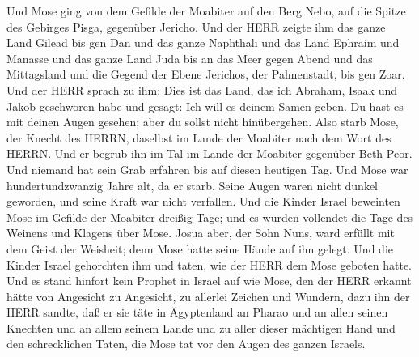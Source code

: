  Und Mose ging von dem Gefilde der Moabiter auf den Berg
Nebo, auf die Spitze des Gebirges Pisga, gegenüber Jericho. Und der HERR
zeigte ihm das ganze Land Gilead bis gen Dan  und das ganze
Naphthali und das Land Ephraim und Manasse und das ganze Land Juda bis
an das Meer gegen Abend  und das Mittagsland und die Gegend
der Ebene Jerichos, der Palmenstadt, bis gen Zoar.  Und der
HERR sprach zu ihm: Dies ist das Land, das ich Abraham, Isaak und Jakob
geschworen habe und gesagt: Ich will es deinem Samen geben. Du hast es
mit deinen Augen gesehen; aber du sollst nicht hinübergehen.
 Also starb Mose, der Knecht des HERRN, daselbst im Lande
der Moabiter nach dem Wort des HERRN.  Und er begrub ihn im
Tal im Lande der Moabiter gegenüber Beth-Peor. Und niemand hat sein Grab
erfahren bis auf diesen heutigen Tag.  Und Mose war
hundertundzwanzig Jahre alt, da er starb. Seine Augen waren nicht dunkel
geworden, und seine Kraft war nicht verfallen.  Und die
Kinder Israel beweinten Mose im Gefilde der Moabiter dreißig Tage; und
es wurden vollendet die Tage des Weinens und Klagens über Mose.
 Josua aber, der Sohn Nuns, ward erfüllt mit dem Geist der
Weisheit; denn Mose hatte seine Hände auf ihn gelegt. Und die Kinder
Israel gehorchten ihm und taten, wie der HERR dem Mose geboten hatte.
 Und es stand hinfort kein Prophet in Israel auf wie Mose,
den der HERR erkannt hätte von Angesicht zu Angesicht,  zu
allerlei Zeichen und Wundern, dazu ihn der HERR sandte, daß er sie täte
in Ägyptenland an Pharao und an allen seinen Knechten und an allem
seinem Lande  und zu aller dieser mächtigen Hand und den
schrecklichen Taten, die Mose tat vor den Augen des ganzen Israels.
